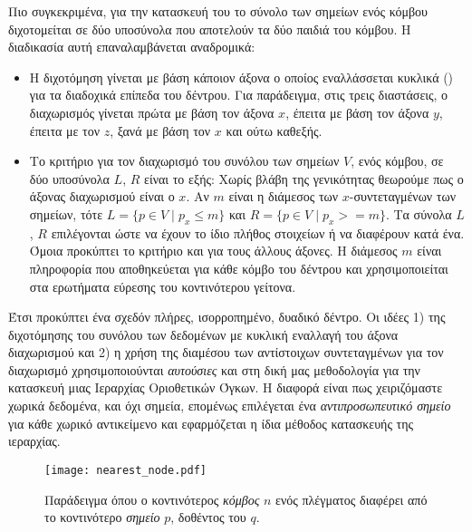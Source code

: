Πιο συγκεκριμένα, για την κατασκευή του  το σύνολο 
των σημείων ενός κόμβου διχοτομείται σε δύο υποσύνολα που αποτελούν 
τα δύο παιδιά του κόμβου. Η διαδικασία αυτή επαναλαμβάνεται αναδρομικά:
\begin{itemize}
    \item Η διχοτόμηση γίνεται με βάση κάποιον άξονα ο οποίος εναλλάσσεται κυκλικά 
    () για τα διαδοχικά επίπεδα του δέντρου.
    Για παράδειγμα, στις τρεις διαστάσεις, ο διαχωρισμός γίνεται πρώτα με 
    βάση τον άξονα $x$, έπειτα με βάση τον άξονα $y$, έπειτα με τον $z$, 
    ξανά με βάση τον $x$ και ούτω καθεξής.
    \item Το κριτήριο για τον διαχωρισμό του συνόλου των σημείων $V$, ενός κόμβου, 
    σε δύο υποσύνολα $L$, $R$ είναι το εξής: Χωρίς βλάβη της γενικότητας 
    θεωρούμε πως ο άξονας διαχωρισμού είναι ο $x$. Αν $m$ είναι η διάμεσος 
    των $x$-συντεταγμένων των σημείων, τότε $L = \{p \in V \mid p_x \leq m \}$ 
    και $R = \{p \in V \mid p_x >= m \}$. 
    Τα σύνολα $L$, $R$ επιλέγονται ώστε να έχουν το ίδιο πλήθος στοιχείων 
    ή να διαφέρουν κατά ένα.
    Όμοια προκύπτει το κριτήριο και για τους άλλους άξονες.
    Η διάμεσος $m$ είναι πληροφορία που αποθηκεύεται για κάθε κόμβο του δέντρου
    και χρησιμοποιείται στα ερωτήματα εύρεσης του κοντινότερου γείτονα.
\end{itemize}

Έτσι προκύπτει ένα σχεδόν πλήρες, ισορροπημένο, δυαδικό δέντρο.
Οι ιδέες 1) της διχοτόμησης του συνόλου των δεδομένων με κυκλική εναλλαγή 
του άξονα διαχωρισμού και 2) η χρήση της διαμέσου των αντίστοιχων 
συντεταγμένων για τον διαχωρισμό  
χρησιμοποιούνται \textit{αυτούσιες} και στη δική μας μεθοδολογία 
για την κατασκευή μιας Ιεραρχίας Οριοθετικών Όγκων. 
Η διαφορά είναι πως χειριζόμαστε χωρικά δεδομένα, και όχι σημεία,
επομένως επιλέγεται ένα \textit{αντιπροσωπευτικό σημείο} για κάθε 
χωρικό αντικείμενο και εφαρμόζεται η ίδια μέθοδος κατασκευής της 
ιεραρχίας. 

\begin{wrapfigure}{l}{0.3\textwidth}
    \texttt{[image: nearest\_node.pdf]}
    \caption[Εύρεση Κοντινότερου Κόμβου από Σημείο]{
        Παράδειγμα όπου ο κοντινότερος \textit{κόμβος} $n$ ενός πλέγματος 
        διαφέρει από το κοντινότερο \textit{σημείο} $p$, δοθέντος 
        του  $q$.}
    \label{fig:nearest_node}
\end{wrapfigure}

